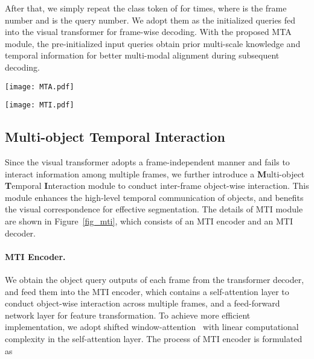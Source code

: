 \documentclass{article}
\begin{document}
After that, we simply repeat the class token of  for  times, where  is the frame number and  is the query number. We adopt them as the initialized queries fed into the visual transformer for frame-wise decoding. With the proposed MTA module, the pre-initialized input queries obtain prior multi-scale knowledge and temporal information for better multi-modal alignment during subsequent decoding.


\begin{figure*}[t!]
\begin{minipage}[t]{0.54\textwidth}
\texttt{[image: MTA.pdf]}
\caption{\textbf{Multi-scale Temporal Aggregation.} For low-level multi-modal temporal aggregation, we propose MTA module for inter-frame interaction, which generates tokens with multi-modal knowledge as the input queries for transformer decoding.}
\label{fig_mta}
\end{minipage} 
\begin{minipage}[t]{0.434\textwidth}
\texttt{[image: MTI.pdf]}
\caption{\textbf{Multi-object Temporal Interaction.} We introduce MTI module for inter-frame object-wise interaction, and maintain a set of video-wise query representations for associating objects across frames.}
\label{fig_mti}
\end{minipage}
\end{figure*}

\subsection{Multi-object Temporal Interaction}
\label{mti}
Since the visual transformer adopts a frame-independent manner and fails to interact information among multiple frames, we further introduce a \textbf{M}ulti-object \textbf{T}emporal \textbf{I}nteraction module to conduct inter-frame object-wise interaction. This module enhances the high-level temporal communication of objects, and benefits the visual correspondence for effective segmentation. The details of MTI module are shown in Figure~\ref{fig_mti}, which consists of an MTI encoder and an MTI decoder.

\paragraph{MTI Encoder.}
We obtain the object query outputs  of each frame from the transformer decoder, and feed them into the MTI encoder, which contains a self-attention layer to conduct object-wise interaction across multiple frames, and a feed-forward network layer for feature transformation. To achieve more efficient implementation, we adopt shifted window-attention~\cite{liu2021swin} with linear computational complexity in the self-attention layer. The process of MTI encoder is formulated as
\end{document}
